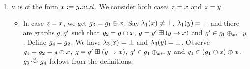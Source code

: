 \begin{enumerate}
\begin{enumerate}
\begin{itemize}
  \end{itemize}
%
\item $a$ is of the form $x:=y.{\it next}$.
%
We consider both cases $z=x$ and $z=y$.
%
  \begin{itemize}
  \item In case $z=x$, we get $g_3=g_1\ominus{\ensuremath{x}}$.
    Say $\lambda_1(x)\neq\bot$, %
    $\lambda_1(y)=\bot$ %
    and there are graphs $g,g'$ such that
    $g_2=g\ominus{\ensuremath{x}}$, %
    $g=g'\boxplus({y}\rightarrow{\ensuremath{x}})$ and %
    $g'\in g_1\oplus_{{x}\leftarrow}{y}$.
    Define $g_4=g_2$.
    We have $\lambda_3(x)=\bot$ and 
    $\lambda_3(y)=\bot$.
    Observe $g_4=g_2=g\oplus{\ensuremath{x}}$,
    $g=g'\boxplus({y}\rightarrow{\ensuremath{x}})$,
    $g'\in g_1\oplus_{{x}\leftarrow}{y}$ and
    $g_1\in(g_1\ominus{\ensuremath{x}})\oplus{\ensuremath{x}}$.
    $g_3\stackrel{a}{\leadsto}g_4$ follows from the definitions.    

\end{itemize}
\end{enumerate}
\end{enumerate}

